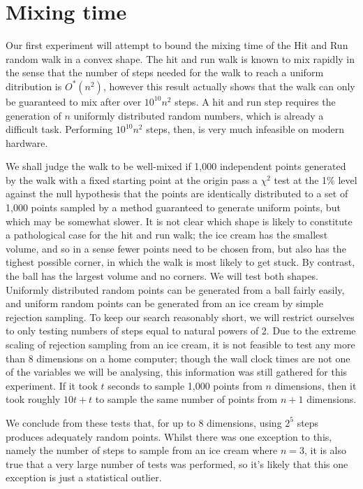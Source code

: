 \section{Mixing time}\label{sec_mix}

Our first experiment will attempt to bound the mixing time of the Hit and Run random walk in a convex shape. The hit and run walk is known to mix rapidly %
in the sense that the number of steps needed for the walk to reach a uniform ditribution is $O^{*}(n^2)$, however this result actually shows that the walk can only be guaranteed to mix after over $10^{10} n^2$
steps. A hit and run step requires the generation of $n$ uniformly distributed random numbers, which is already a difficult task. Performing $10^{10} n^2$ steps, then, is very much infeasible on modern hardware.

We shall judge the walk to be well-mixed if 1,000 independent points generated by the walk with a fixed starting point at the origin pass a $\chi^2$ test at the 1\% level against the null hypothesis that the points are identically distributed to a set of 1,000 points sampled by a method guaranteed to generate uniform points, but which may be somewhat slower. It is not clear which shape is likely to constitute a pathological case for the hit and run walk; the ice cream has the smallest volume, and so in a sense fewer points need to be chosen from, but also has the tighest possible corner, in which the walk is most likely to get stuck. By contrast, the ball has the largest volume and no corners. We will test both shapes. Uniformly distributed random points can be generated from a ball fairly easily, and uniform random points can be generated from an ice cream by simple rejection sampling. To keep our search reasonably short, we will restrict ourselves to only testing numbers of steps equal to natural powers of 2. Due to the extreme scaling of rejection sampling from an ice cream, it is not feasible to test any more than 8 dimensions on a home computer; though the wall clock times are not one of the variables we will be analysing, this information was still gathered for this experiment. If it took $t$ seconds to sample 1,000 points from $n$ dimensions, then it took roughly $10t+t$ to sample the same number of points from $n+1$ dimensions.


We conclude from these tests that, for up to 8 dimensions, using $2^5$ steps produces adequately random points. Whilst there was one exception to this, namely the number of steps to sample from an ice cream where $n=3$, it is also true that a very large number of tests was performed, so it's likely that this one exception is just a statistical outlier.

